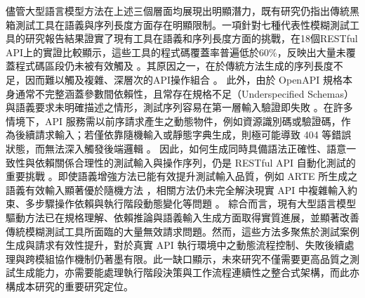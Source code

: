 \begin{ZhChapter}
\text 儘管大型語言模型方法在上述三個層面均展現出明顯潛力，既有研究仍指出傳統黑箱測試工具在語義與序列長度方面存在明顯限制。一項針對七種代表性模糊測試工具的研究報告結果證實了現有工具在語義和序列長度方面的挑戰，在18個RESTful API上的實證比較顯示，這些工具的程式碼覆蓋率普遍低於60\%，反映出大量未覆蓋程式碼區段仍未被有效觸及 \parencite{Zhang2024Open}。其原因之一，在於傳統方法生成的序列長度不足，因而難以觸及複雜、深層次的API操作組合 \parencite{Karlsson2020QuickREST}。
\text 此外，由於 OpenAPI 規格本身通常不完整涵蓋參數間依賴性，且常存在規格不足（Underspecified Schemas）與語義要求未明確描述之情形，測試序列容易在第一層輸入驗證即失敗 \parencite{Banias2021Automated, Zhang2024Open}。在許多情境下，API 服務需以前序請求產生之動態物件，例如資源識別碼或驗證碼，作為後續請求輸入；若僅依靠隨機輸入或靜態字典生成，則極可能導致 404 等錯誤狀態，而無法深入觸發後端邏輯 \parencite{Karlsson2020QuickREST, Banias2021Automated}。
\text 因此，如何生成同時具備語法正確性、語意一致性與依賴關係合理性的測試輸入與操作序列，仍是 RESTful API 自動化測試的重要挑戰 \parencite{Kim2025LlamaRestTest, Zheng2024RESTLess}。即使語義增強方法已能有效提升測試輸入品質，例如 ARTE 所生成之語義有效輸入顯著優於隨機方法 \parencite{Alonso2023ARTE}，相關方法仍未完全解決現實 API 中複雜輸入約束、多步驟操作依賴與執行階段動態變化等問題 \parencite{Nguyen2024KAT}。
\text 綜合而言，現有大型語言模型驅動方法已在規格理解、依賴推論與語義輸入生成方面取得實質進展，並顯著改善傳統模糊測試工具所面臨的大量無效請求問題。然而，這些方法多聚焦於測試案例生成與請求有效性提升，對於真實 API 執行環境中之動態流程控制、失敗後續處理與跨模組協作機制仍著墨有限。此一缺口顯示，未來研究不僅需要更高品質之測試生成能力，亦需要能處理執行階段決策與工作流程連續性之整合式架構，而此亦構成本研究的重要研究定位。


	


\end{ZhChapter}
